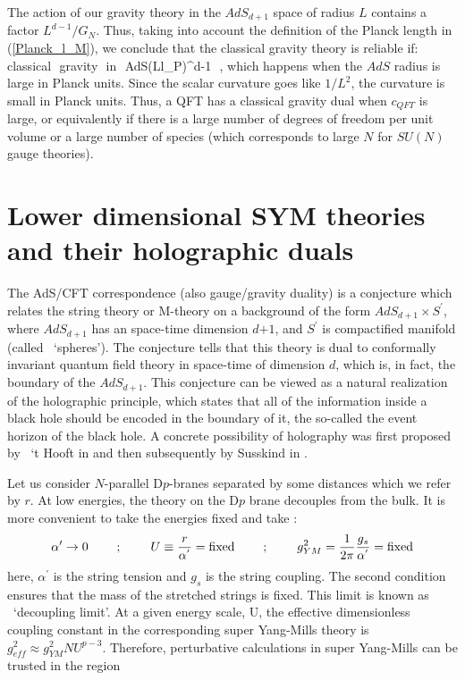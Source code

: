 The action of our gravity theory in the $AdS_{d+1}$ space of radius $L$ contains a factor $ L^{d-1}/G_N$. 
Thus, taking into account the definition of the Planck length in (\ref{Planck_l_M}), we conclude that the classical  gravity theory is reliable if:
\beq
{\rm classical\,\, gravity\,\, in\,\, AdS}\to \Big({L\over l_P}\Big)^{d-1} \,\,,
\eeq
which happens when the $AdS$ radius is large in Planck units. Since the scalar curvature goes like $1/L^2$, the curvature 
is small in Planck units. Thus, a QFT has a classical gravity dual when $c_{QFT}$ is large, or equivalently if there is a large 
number of degrees of freedom per unit volume or a large number of species (which corresponds to large $N$ for $SU(N)$ gauge theories). 



\section{Lower dimensional SYM theories and their holographic duals}

The AdS/CFT correspondence (also gauge/gravity duality) is a conjecture which relates
the string theory or M-theory on a background of the form 
$ AdS_{d+1} \times S^{'} $, where $ AdS_{d+1}$ has an 
space-time dimension $\textit{d+1}$, and $S^{'}$ is compactified manifold 
(called ~`spheres'). The conjecture tells that this theory is dual to conformally invariant quantum field theory 
in space-time of dimension $\textit{d}$, which is, in fact, the boundary of the $AdS_{d+1}$. This conjecture can be 
viewed as a natural realization of the holographic principle, which states that all of the information inside a black hole should 
be encoded in the 
boundary of it, the so-called the event horizon of the black hole. A concrete possibility of holography was first 
proposed by ~`t Hooft in \cite{tHooft:1993dmi} and then subsequently by Susskind in \cite{Susskind:1994vu}.

Let us consider $N$-parallel D$p$-branes separated by some distances which we refer by $r$. At 
low energies, the theory on the D$p$ brane decouples from the bulk. It is more convenient to
take the energies fixed and take :
\[ \alpha^{\prime} \rightarrow 0  \hspace{8mm} ; \hspace{8mm} U \equiv \frac{r}{\alpha^{'}} = \text{fixed} \hspace{8mm} 
; \hspace{8mm} g^{2}_{YM} = \frac{1}{2\pi} \frac{g_{s}}{\alpha^{'}} = \text{fixed}   \]
here, $\alpha^{\prime}$ is the string tension and $g_{s}$ is the string coupling. The 
second condition ensures that the mass of the stretched strings is fixed. This limit is known as ~`decoupling limit'.  
At a given energy scale, U, the effective dimensionless coupling constant in 
the corresponding super Yang-Mills theory is $ g_{eff}^{2} \approx g_{YM}^{2} NU^{p-3}$. 
Therefore, perturbative calculations in super Yang-Mills can be trusted in the region 



